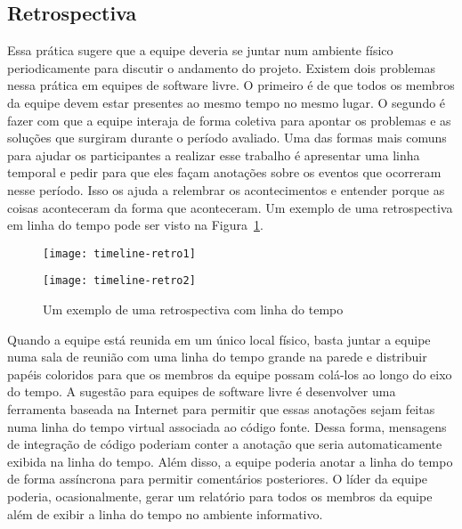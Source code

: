 \subsection{Retrospectiva}
\label{subsec:retrospect}

Essa prática sugere que a equipe deveria se juntar num ambiente físico
periodicamente para discutir o andamento do projeto. Existem dois
problemas nessa prática em equipes de software livre. O primeiro é de
que todos os membros da equipe devem estar presentes ao mesmo tempo no
mesmo lugar. O segundo é fazer com que a equipe interaja de forma
coletiva para apontar os problemas e as soluções que surgiram durante
o período avaliado. Uma das formas mais comuns para ajudar os
participantes a realizar esse trabalho é apresentar uma linha temporal
e pedir para que eles façam anotações sobre os eventos que ocorreram
nesse período. Isso os ajuda a relembrar os acontecimentos e entender
porque as coisas aconteceram da forma que aconteceram. Um exemplo de
uma retrospectiva em linha do tempo pode ser visto na
Figura~\ref{fig:timelineretro}.



\begin{figure}[htb]
  \begin{minipage}[t]{0.5\linewidth}
    \centering
    \texttt{[image: timeline-retro1]}
  \end{minipage}
  \begin{minipage}[t]{0.5\linewidth}
    \centering
    \texttt{[image: timeline-retro2]}
  \end{minipage}
  \caption{Um exemplo de uma retrospectiva com linha do tempo}
  \label{fig:timelineretro}
\end{figure}

Quando a equipe está reunida em um único local físico, basta juntar a
equipe numa sala de reunião com uma linha do tempo grande na parede e
distribuir papéis coloridos para que os membros da equipe possam
colá-los ao longo do eixo do tempo. A sugestão para equipes de
software livre é desenvolver uma ferramenta baseada na Internet para
permitir que essas anotações sejam feitas numa linha do tempo virtual
associada ao código fonte. Dessa forma, mensagens de integração de
código poderiam conter a anotação que seria automaticamente exibida na
linha do tempo. Além disso, a equipe poderia anotar a linha do tempo
de forma assíncrona para permitir comentários posteriores. O líder da
equipe poderia, ocasionalmente, gerar um relatório para todos os
membros da equipe além de exibir a linha do tempo no ambiente
informativo.

